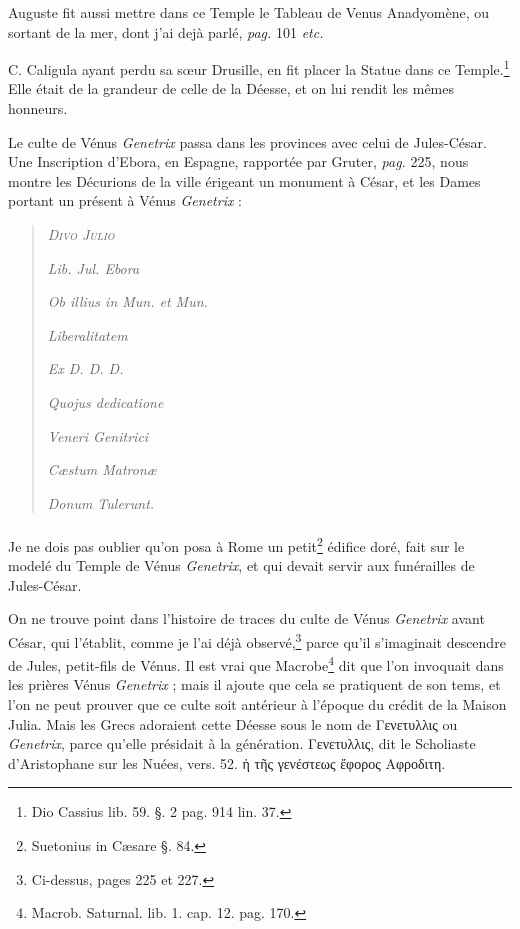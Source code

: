 \documentclass[a4paper, 18pt, oneside]{article}
\begin{document}
Auguste fit aussi mettre dans ce Temple le Tableau de Venus Anadyomène, ou sortant de la mer, dont j'ai dejà parlé, \emph{pag.} 101 \emph{etc.}

C. Caligula ayant perdu sa sœur Drusille, en fit placer la Statue dans ce Temple.\footnote{Dio Cassius lib. 59. §. 2 pag. 914 lin. 37.} Elle était de la grandeur de celle de la Déesse, et on lui rendit les mêmes honneurs.

Le culte de Vénus \emph{Genetrix} passa dans les provinces avec celui de Jules-César. Une Inscription d'Ebora, en Espagne, rapportée par Gruter, \emph{pag.} 225, nous montre les Décurions de la ville érigeant un monument à César, et les Dames portant un présent à Vénus \emph{Genetrix} :
\begin{quotation}
\scshape
\hspace*{10mm}\emph{Divo Julio}

\hspace*{5mm}\emph{Lib. Jul. Ebora}

\emph{Ob illius in Mun. et Mun.}

\hspace*{10mm}\emph{Liberalitatem}

\hspace*{15mm}\emph{Ex D. D. D.}

\hspace*{5mm}\emph{Quojus dedicatione}

\hspace*{10mm}\emph{Veneri Genitrici}

\hspace*{5mm}\emph{Cæstum Matronæ}

\hspace*{10mm}\emph{Donum Tulerunt.}
\end{quotation}
\paragraph{}
Je ne dois pas oublier qu'on posa à Rome un petit\footnote{Suetonius in Cæsare §. 84.} édifice doré, fait sur le modelé du Temple de Vénus \emph{Genetrix}, et qui devait servir aux funérailles de Jules-César.

On ne trouve point dans l'histoire de traces du culte de Vénus \emph{Genetrix} avant César, qui l'établit, comme je l'ai déjà observé,\footnote{Ci-dessus, pages 225 et 227.} parce qu'il s'imaginait descendre de Jules, petit-fils de Vénus. Il est vrai que Macrobe\footnote{Macrob. Saturnal. lib. 1. cap. 12. pag. 170.} dit que l'on invoquait dans les prières Vénus \emph{Genetrix} ; mais il ajoute que cela se pratiquent de son tems, et l'on ne peut prouver que ce culte soit antérieur à l'époque du crédit de la Maison Julia. Mais les Grecs adoraient cette Déesse sous le nom de Γενετυλλις ou \emph{Genetrix}, parce qu'elle présidait à la génération. Γενετυλλις, dit le Scholiaste d'Aristophane sur les Nuées, vers. 52. ἡ τῆς γενέστεως ἔφορος Αφροδιτη.
\end{document}
